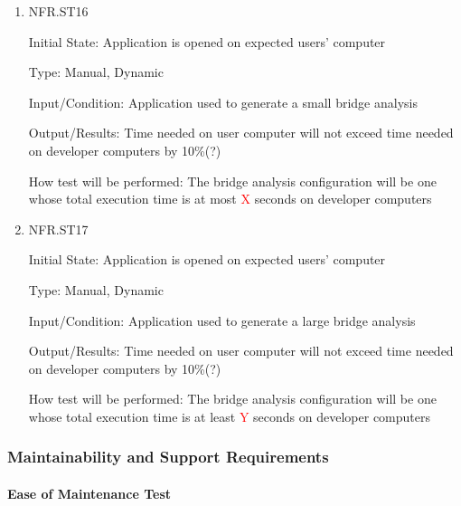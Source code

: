 \documentclass[12pt, titlepage]{article}
\begin{document}
\begin{enumerate}

\item{NFR.ST16\\}

Initial State: Application is opened on expected users' computer

Type: Manual, Dynamic

Input/Condition: Application used to generate a small bridge analysis

Output/Results: Time needed on user computer will not exceed time needed on developer computers by 10\%(?)

How test will be performed: The bridge analysis configuration will be one whose total execution time is at most \textcolor{red}{X} seconds on developer computers

\item{NFR.ST17\\}

Initial State: Application is opened on expected users' computer

Type: Manual, Dynamic

Input/Condition: Application used to generate a large bridge analysis

Output/Results: Time needed on user computer will not exceed time needed on developer computers by 10\%(?)

How test will be performed: The bridge analysis configuration will be one whose total execution time is at least \textcolor{red}{Y} seconds on developer computers

\end{enumerate}

\subsubsection{Maintainability and Support Requirements}
		
\paragraph{Ease of Maintenance Test}
\end{document}
